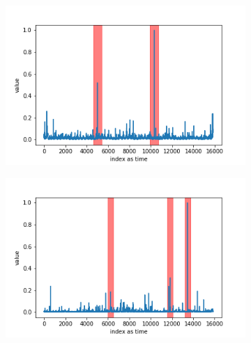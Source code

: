 \documentclass[12pt]{article}
\begin{document}
\begin{figure}[H]
  \begin{subfigure}[t]{.5\textwidth}
    \centering
    \includegraphics[width=\linewidth]{images/dataAnomalies/twitter/Twitter_volume_FB.png}
  \end{subfigure}
  \hfill
  \begin{subfigure}[t]{.5\textwidth}
    \centering
    \includegraphics[width=\linewidth]{images/dataAnomalies/twitter/Twitter_volume_KO.png}
  \end{subfigure}

  \medskip


\end{figure}
\end{document}
